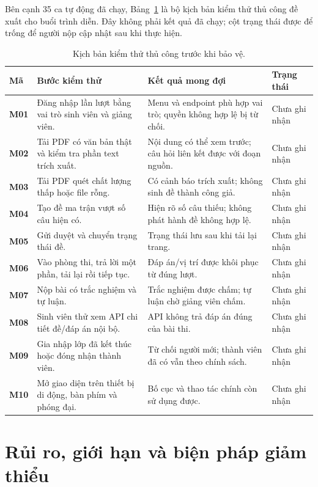 Bên cạnh 35 ca tự động đã chạy, Bảng~\ref{tab:manual-tests} là bộ kịch bản
kiểm thử thủ công đề xuất cho buổi trình diễn. Đây không phải kết quả đã
chạy; cột trạng thái được để trống để người nộp cập nhật sau khi thực hiện.
\begin{table}[H]
\centering
\caption{Kịch bản kiểm thử thủ công trước khi bảo vệ.}
\label{tab:manual-tests}
\begin{tabularx}{\textwidth}{>{\bfseries\color{daumaroon}}p{}X X p{}}
\toprule
\rowcolor{gray100}Mã & Bước kiểm thử & Kết quả mong đợi & Trạng thái \\
\midrule
M01 & Đăng nhập lần lượt bằng vai trò sinh viên và giảng viên. & Menu và endpoint phù hợp vai trò; quyền không hợp lệ bị từ chối. & Chưa ghi nhận \\
M02 & Tải PDF có văn bản thật và kiểm tra phần text trích xuất. & Nội dung có thể xem trước; câu hỏi liên kết được với đoạn nguồn. & Chưa ghi nhận \\
M03 & Tải PDF quét chất lượng thấp hoặc file rỗng. & Có cảnh báo trích xuất; không sinh đề thành công giả. & Chưa ghi nhận \\
M04 & Tạo đề ma trận vượt số câu hiện có. & Hiện rõ số câu thiếu; không phát hành đề không hợp lệ. & Chưa ghi nhận \\
M05 & Gửi duyệt và chuyển trạng thái đề. & Trạng thái lưu sau khi tải lại trang. & Chưa ghi nhận \\
M06 & Vào phòng thi, trả lời một phần, tải lại rồi tiếp tục. & Đáp án/vị trí được khôi phục từ đúng lượt. & Chưa ghi nhận \\
M07 & Nộp bài có trắc nghiệm và tự luận. & Trắc nghiệm được chấm; tự luận chờ giảng viên chấm. & Chưa ghi nhận \\
M08 & Sinh viên thử xem API chi tiết đề/đáp án nội bộ. & API không trả đáp án đúng của bài thi. & Chưa ghi nhận \\
M09 & Gia nhập lớp đã kết thúc hoặc đóng nhận thành viên. & Từ chối người mới; thành viên đã có vẫn theo chính sách. & Chưa ghi nhận \\
M10 & Mở giao diện trên thiết bị di động, bàn phím và phóng đại. & Bố cục và thao tác chính còn sử dụng được. & Chưa ghi nhận \\
\bottomrule
\end{tabularx}
\end{table}

\section{Rủi ro, giới hạn và biện pháp giảm thiểu}
\label{sec:risk-register}

